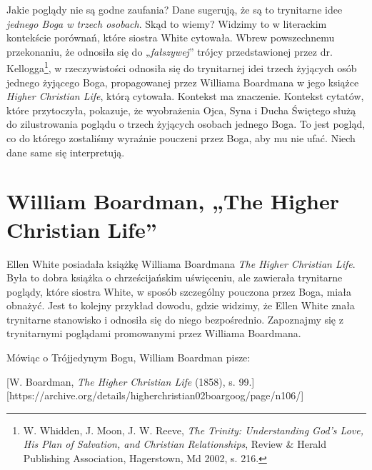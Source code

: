 Jakie poglądy nie są godne zaufania? Dane sugerują, że są to trynitarne idee \textit{jednego Boga w trzech osobach}. Skąd to wiemy? Widzimy to w literackim kontekście porównań, które siostra White cytowała. Wbrew powszechnemu przekonaniu, że odnosiła się do „\textit{fałszywej}” trójcy przedstawionej przez dr. Kellogga\footnote{W. Whidden, J. Moon, J. W. Reeve, \textit{The Trinity: Understanding God's Love, His Plan of Salvation, and Christian Relationships}, Review \& Herald Publishing Association, Hagerstown, Md 2002, s. 216.}, w rzeczywistości odnosiła się do trynitarnej idei trzech żyjących osób jednego żyjącego Boga, propagowanej przez Williama Boardmana w jego książce \textit{Higher Christian Life}, którą cytowała. Kontekst ma znaczenie. Kontekst cytatów, które przytoczyła, pokazuje, że wyobrażenia Ojca, Syna i Ducha Świętego służą do zilustrowania poglądu o trzech żyjących osobach jednego Boga. To jest pogląd, co do którego zostaliśmy wyraźnie pouczeni przez Boga, aby mu nie ufać. Niech dane same się interpretują.

\section*{William Boardman, „The Higher Christian Life”}

Ellen White posiadała książkę Williama Boardmana \textit{The Higher Christian Life}. Była to dobra książka o chrześcijańskim uświęceniu, ale zawierała trynitarne poglądy, które siostra White, w sposób szczególny pouczona przez Boga, miała obnażyć. Jest to kolejny przykład dowodu, gdzie widzimy, że Ellen White znała trynitarne stanowisko i odnosiła się do niego bezpośrednio. Zapoznajmy się z trynitarnymi poglądami promowanymi przez Williama Boardmana.

Mówiąc o Trójjedynym Bogu, William Boardman pisze:

[W. Boardman, \textit{The Higher Christian Life} (1858), s. 99.][https://archive.org/details/higherchristian02boargoog/page/n106/]

